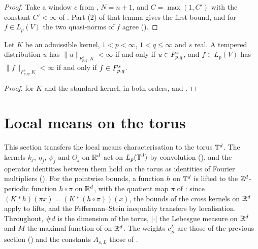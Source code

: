 \begin{proof}
\leanok
Take a window $c$ from , $N = n + 1$, and
$C = \max(1, C')$ with the constant $C' < \infty$ of . Part
(2) of that lemma gives the first bound, and for $f \in L_p(V)$ the two quasi-norms of $f$ agree
().
\end{proof}

\begin{corollary}
\label{cor:lp-family-same-spaces}
\leanok
{}
Let $K$ be an admissible kernel, $1 < p < \infty$, $1 < q \leq \infty$ and $s$ real. A tempered
distribution $u$ has $\|u\|_{F^s_{p,q}, K} < \infty$ if and only if $u \in F^{s}_{p,q}$, and
$f \in L_p(V)$ has $\|f\|_{F^s_{p,q}, K} < \infty$ if and only if $f \in F^{s}_{p,q}$.
\end{corollary}

\begin{proof}
\leanok
{} for $K$ and the standard kernel, in both orders, and
.
\end{proof}

\section{Local means on the torus}
\label{sec:torus-tl-local-means}

This section transfers the local means characterisation to the torus $\mathbb{T}^d$. The kernels $k_j$,
$\eta_j$, $\psi_j$ and $\Theta_j$ on $\mathbb{R}^d$ act on $L_p(\mathbb{T}^d)$ by convolution
(), and the operator identities between them hold on the torus as
identities of Fourier multipliers (). For the pointwise bounds,
a function $h$ on $\mathbb{T}^d$ is lifted to the $\mathbb{Z}^d$-periodic function $h \circ \pi$ on $\mathbb{R}^d$, with
the quotient map $\pi$ of : since $(K * h)(\pi x) = (K * (h \circ \pi))(x)$,
the bounds of the cross kernels on $\mathbb{R}^d$ apply to lifts, and the Fefferman--Stein inequality
transfers by localisation. Throughout, $\#d$ is the dimension of the torus, $|\cdot|$ the
Lebesgue measure on $\mathbb{R}^d$ and $M$ the maximal function of  on $\mathbb{R}^d$.
The weights $c^L_{ji}$ are those of the previous section ()
and the constants $A_{s,L}$ those of .

